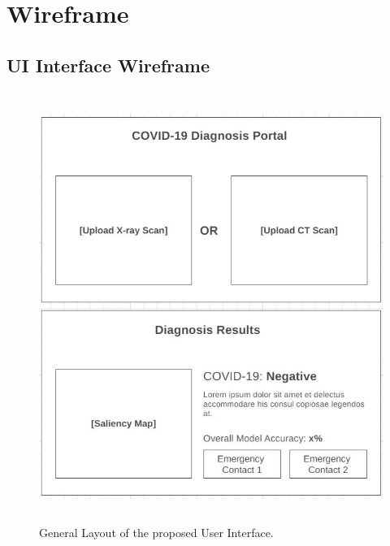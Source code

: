 
\chapter{Wireframe} \label{Wireframe} %


\section*{UI Interface Wireframe}



 \begin{figure}[H]
 \centering
 \includegraphics[width=15.5cm, height=14cm]{Images/Wireframe.JPG}
 \decoRule
 \caption[User Interface Wireframe]{General Layout of the proposed User Interface.}
 \label{fig:Wireframe}
 \end{figure}
